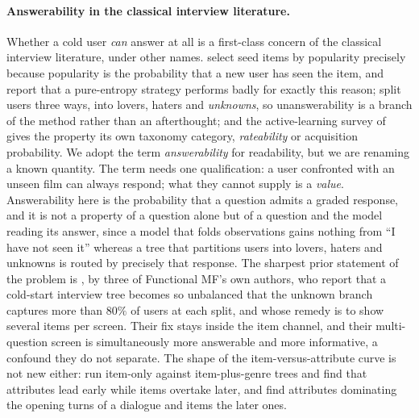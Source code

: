 \documentclass[manuscript,screen]{acmart}
\begin{document}
\paragraph{Answerability in the classical interview literature.}\label{sec:answerability} Whether a cold user \emph{can} answer at all is a first-class concern of the classical interview literature, under other names. \citet{rashid2002getting} select seed items by popularity precisely because popularity is the probability that a new user has seen the item, and report that a pure-entropy strategy performs badly for exactly this reason; \citet{golbandi2011adaptive} split users three ways, into lovers, haters and \emph{unknowns}, so unanswerability is a branch of the method rather than an afterthought; and the active-learning survey of \citet{elahi2016survey} gives the property its own taxonomy category, \emph{rateability} or acquisition probability. We adopt the term \emph{answerability} for readability, but we are renaming a known quantity. The term needs one qualification: a user confronted with an unseen film can always respond; what they cannot supply is a \emph{value}. Answerability here is the probability that a question admits a graded response, and it is not a property of a question alone but of a question and the model reading its answer, since a model that folds observations gains nothing from ``I have not seen it'' whereas a tree that partitions users into lovers, haters and unknowns is routed by precisely that response. The sharpest prior statement of the problem is \citet{sun2013learning}, by three of Functional MF's own authors, who report that a cold-start interview tree becomes so unbalanced that the unknown branch captures more than $80\%$ of users at each split, and whose remedy is to show several items per screen. Their fix stays inside the item channel, and their multi-question screen is simultaneously more answerable and more informative, a confound they do not separate. The shape of the item-versus-attribute curve is not new either: \citet{gharahighehi2025pairwise} run item-only against item-plus-genre trees and find that attributes lead early while items overtake later, and \citet{xia2026when} find attributes dominating the opening turns of a dialogue and items the later ones.
\end{document}

